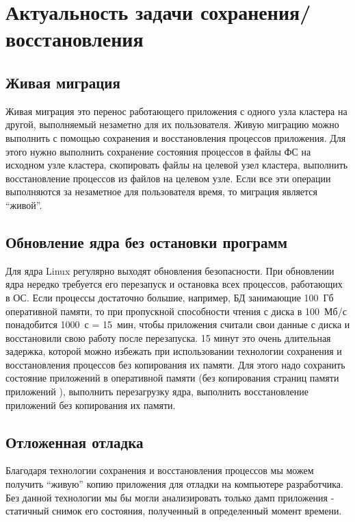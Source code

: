\section{Актуальность задачи сохранения/восстановления}

\subsection{Живая миграция}

Живая миграция это перенос работающего приложения с одного узла кластера на другой, выполняемый незаметно для их пользователя. 
Живую миграцию можно выполнить с помощью сохранения и восстановления процессов приложения. Для этого нужно выполнить сохранение 
состояния процессов в файлы ФС на исходном узле кластера, скопировать файлы на целевой узел кластера, выполнить восстановление 
процессов из файлов на целевом узле. Если все эти операции выполняются за незаметное для пользователя время, то миграция является “живой”.
 
\subsection{Обновление ядра без остановки программ}
 
Для ядра Linux регулярно выходят обновления безопасности. При обновлении ядра нередко требуется его перезапуск и 
остановка всех процессов, работающих в ОС. Если процессы достаточно большие, например, БД занимающие 100~Гб 
оперативной памяти, то при пропускной способности чтения с диска в 100~Мб/с понадобится 1000~с = 15~мин, чтобы 
приложения считали свои данные с диска и восстановили свою работу после перезапуска. 15 минут это очень длительная 
задержка, которой можно избежать при использовании технологии сохранения и восстановления процессов без копирования их 
памяти. Для этого надо сохранить состояние приложений в оперативной памяти (без копирования страниц памяти приложений  \cite{url:lwn-kexec-persist-mem}), выполнить перезагрузку ядра, выполнить восстановление приложений без 
копирования их памяти.
 
\subsection{Отложенная отладка}
 
Благодаря технологии сохранения и восстановления процессов мы можем получить “живую” копию приложения для отладки на 
компьютере разработчика. Без данной технологии мы бы могли анализировать только дамп приложения - статичный снимок его 
состояния, полученный в определенный момент времени.
 
